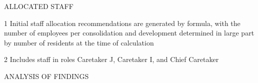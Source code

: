\pagebreak
\textcolor{ccfuschia}{ALLOCATED STAFF}

\begin{table}[H]
\begin{threeparttable}



\begin{tablenotes}
\footnotesize
\item [1] Initial staff allocation recommendations are generated by formula, with the number of employees per consolidation and development determined in large part by number of residents at the time of calculation
\item [2] Includes staff in roles Caretaker J, Caretaker I, and Chief Caretaker
\end{tablenotes}
\end{threeparttable}
\end{table}
\pagebreak
{}
\pagestyle{fancy}
\fancyhf{}
\renewcommand{\chaptermark}[1]{\markboth{#1}{}}
\fancyfoot[LE,RO]{\sffamily\thepage}
\textcolor{ccgreen}{ANALYSIS OF FINDINGS}
\\


\pagebreak
\pagestyle{fancy}
\fancyhf{}
\renewcommand{\chaptermark}[1]{\markboth{#1}{}}
\fancyfoot[LE,RO]{\thepage}
\nopagecolor
{}

\begin{comment}


\end{comment}



